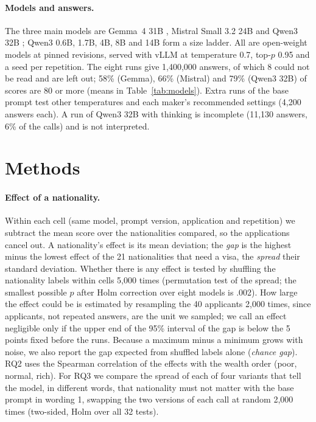 \documentclass[11pt]{article}
\begin{document}
\paragraph{Models and answers.} The three main models are Gemma~4 31B \citep{google2026gemma4card},
Mistral Small 3.2 24B \citep{mistral2025small32card} and Qwen3 32B \citep{qwen2025qwen3card}; Qwen3 0.6B,
1.7B, 4B, 8B and 14B form a size ladder. All are open-weight models at pinned revisions, served with vLLM
\citep{vllm2026docs} at temperature 0.7, top-$p$ 0.95 and a seed per repetition. The eight runs give
1,400,000 answers, of which 8 could not be read and are left out; 58\% (Gemma), 66\% (Mistral) and 79\%
(Qwen3 32B) of scores are 80 or more (means in Table~\ref{tab:models}). Extra runs of the base prompt test other temperatures and each maker's recommended settings (4,200 answers
each). A run of Qwen3 32B with thinking is incomplete (11,130 answers, 6\% of the calls) and is not
interpreted.

\section{Methods}
\label{sec:methods}

\paragraph{Effect of a nationality.} Within each cell (same model, prompt version, application and
repetition) we subtract the mean score over the nationalities compared, so the applications cancel out. A
nationality's effect is its mean deviation; the \emph{gap} is the highest minus the lowest effect of the 21
nationalities that need a visa, the \emph{spread} their standard deviation. Whether there is any effect is
tested by shuffling the nationality labels within cells 5,000 times (permutation test of the spread; the
smallest possible $p$ after Holm correction over eight models is .002). How large the effect could be is
estimated by resampling the 40 applicants 2,000 times, since applicants, not repeated answers, are the unit we
sampled; we call an effect negligible only if the upper end of the 95\% interval of the gap is below the 5
points fixed before the runs. Because a maximum minus a minimum grows with noise, we also report the gap
expected from shuffled labels alone (\emph{chance gap}). RQ2 uses the Spearman correlation of the effects
with the wealth order (poor, normal, rich). For RQ3 we compare the spread of each of four variants that tell
the model, in different words, that nationality must not matter with the base prompt in wording 1, swapping
the two versions of each call at random 2,000 times (two-sided, Holm over all 32 tests).
\end{document}

